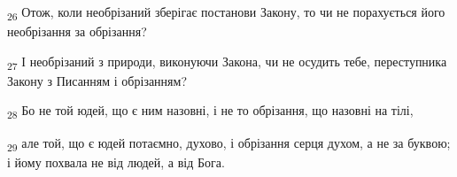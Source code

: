\begin{tcolorbox}
\textsubscript{26} Отож, коли необрізаний зберігає постанови Закону, то чи не порахується його необрізання за обрізання?
\end{tcolorbox}
\begin{tcolorbox}
\textsubscript{27} І необрізаний з природи, виконуючи Закона, чи не осудить тебе, переступника Закону з Писанням і обрізанням?
\end{tcolorbox}
\begin{tcolorbox}
\textsubscript{28} Бо не той юдей, що є ним назовні, і не то обрізання, що назовні на тілі,
\end{tcolorbox}
\begin{tcolorbox}
\textsubscript{29} але той, що є юдей потаємно, духово, і обрізання серця духом, а не за буквою; і йому похвала не від людей, а від Бога.
\end{tcolorbox}
